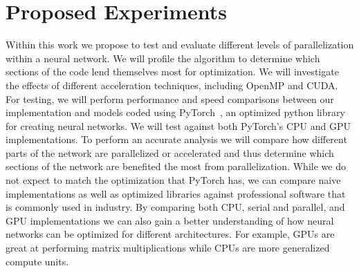 \documentclass[10pt,twocolumn,letterpaper]{article}
\begin{document}
\section{Proposed Experiments}
%
Within this work we propose to test and evaluate different levels of parallelization within a neural network. We will profile the algorithm to determine which sections of the code lend themselves most for optimization. We will investigate the effects of different acceleration techniques, including OpenMP and CUDA. For testing, we will perform performance and speed comparisons between our implementation and models coded using PyTorch~\cite{paszke2017automatic}, an optimized python library for creating neural networks. We will test against both PyTorch's CPU and GPU implementations. To perform an accurate analysis we will compare how different parts of the network are parallelized or accelerated and thus determine which sections of the network are benefited the most from parallelization.  While we do not expect to match the optimization that PyTorch has, we can compare naive implementations as well as optimized libraries against professional software that is commonly used in industry. By comparing both CPU, serial and parallel, and GPU implementations we can also gain a better understanding of how neural networks can be optimized for different architectures. For example, GPUs are great at performing matrix multiplications while CPUs are more generalized compute units. 

%

%
 
%
\end{document}
